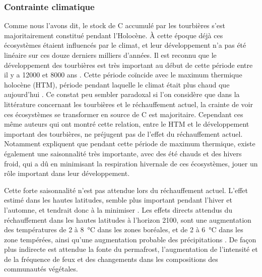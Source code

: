 \subsubsection{Contrainte climatique}

Comme nous l'avons dit, le stock de C accumulé par les tourbières s'est majoritairement constitué pendant l'Holocène.
À cette époque déjà ces écosystèmes étaient influencés par le climat, et leur développement n'a pas été linéaire sur ces douze derniers milliers d'années.
Il est reconnu que le développement des tourbières est très important au début de cette période entre il y a \num{12000} et \num{8000} ans \citep{smith2004,macdonald2006,yu2009}.
Cette période coïncide avec le maximum thermique holocène (HTM), période pendant laquelle le climat était plus chaud que aujourd’hui \citep{kaufman2004}.
Ce constat peu sembler paradoxal si l'on considère que dans la littérature concernant les tourbières et le réchauffement actuel, la crainte de voir ces écosystèmes se transformer en source de C est majoritaire.
Cependant ces même auteurs qui ont montré cette relation, entre le HTM et le développement important des tourbières, ne préjugent pas de l'effet du réchauffement actuel.
Notamment \citet{jones2010} expliquent que pendant cette période de maximum thermique, existe également une saisonnalité très importante, avec des été chauds et des hivers froid, qui a dû en minimisant la respiration hivernale de ces écosystèmes, jouer un rôle important dans leur développement.

Cette forte saisonnalité n'est pas attendue lors du réchauffement actuel.
L'effet estimé dans les hautes latitudes, semble plus important pendant l'hiver et l'automne, et tendrait donc à la minimiser \citep{christensen2007}.
Les effets directs attendus du réchauffement dans les hautes latitudes à l'horizon 2100, sont une augmentation des températures de 2 à \SI{8}{\degreeCelsius} dans les zones boréales, et de 2 à \SI{6}{\degreeCelsius} dans les zone tempérées, ainsi  qu'une augmentation probable des précipitations \citep{christensen2013,frolking2011}.
De façon plus indirecte est attendue la fonte du permafrost, l'augmentation de l'intensité et de la fréquence de feux et des changements dans les compositions des communautés végétales.

